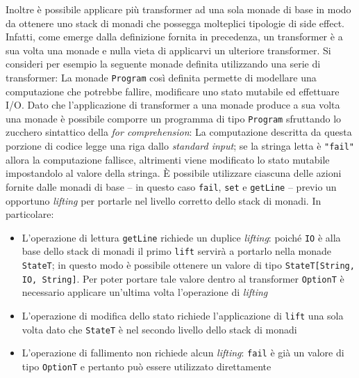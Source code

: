 Inoltre è possibile applicare più transformer ad una sola monade di base in modo da ottenere uno stack di monadi che possegga molteplici tipologie di side effect. Infatti, come emerge dalla definizione fornita in precedenza, un transformer è a sua volta una monade e nulla vieta di applicarvi un ulteriore transformer.
Si consideri per esempio la seguente monade definita utilizzando una serie di transformer:
La monade \lstinline{Program} così definita permette di modellare una computazione che potrebbe fallire, modificare uno stato mutabile ed effettuare I/O. Dato che l'applicazione di transformer a una monade produce a sua volta una monade è possibile comporre un programma di tipo \lstinline{Program} sfruttando lo zucchero sintattico della \emph{for comprehension}:
La computazione descritta da questa porzione di codice legge una riga dallo \emph{standard input}; se la stringa letta è \lstinline{"fail"} allora la computazione fallisce, altrimenti viene modificato lo stato mutabile impostandolo al valore della stringa.
È possibile utilizzare ciascuna delle azioni fornite dalle monadi di base -- in questo caso \lstinline{fail}, \lstinline{set} e \lstinline{getLine} -- previo un opportuno \emph{lifting} per portarle nel livello corretto dello stack di monadi. In particolare:
\begin{itemize}
  \item L'operazione di lettura \lstinline{getLine} richiede un duplice \emph{lifting}: poiché \lstinline{IO} è alla base dello stack di monadi il primo \lstinline{lift} servirà a portarlo nella monade \lstinline{StateT}; in questo modo è possibile ottenere un valore di tipo \lstinline{StateT[String, IO, String]}. Per poter portare tale valore dentro al transformer \lstinline{OptionT} è necessario applicare un'ultima volta l'operazione di \emph{lifting}
  \item L'operazione di modifica dello stato richiede l'applicazione di \lstinline{lift} una sola volta dato che \lstinline{StateT} è nel secondo livello dello stack di monadi
  \item L'operazione di fallimento non richiede alcun \emph{lifting}: \lstinline{fail} è già un valore di tipo \lstinline{OptionT} e pertanto può essere utilizzato direttamente
\end{itemize}

